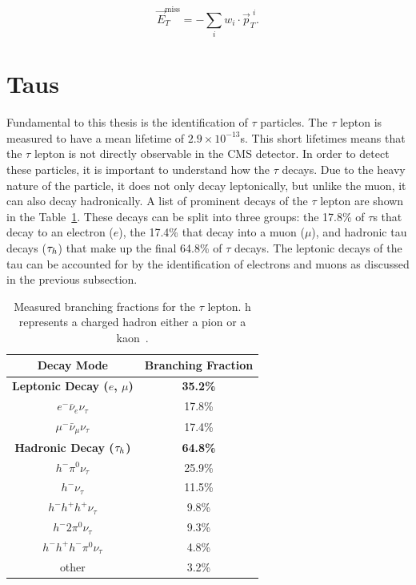 \begin{equation}
\vec{E}_{T}^{\text{miss}} = - \sum_{i} w_{i} \cdot \vec{p}_{T}^{\hspace{4pt}i}.
\end{equation}

\section{Taus}
\label{sec:taus}

Fundamental to this thesis is the identification of $\tau$ particles.
The $\tau$ lepton is measured to have a mean lifetime of \(2.9 \times 10^{-13}\)s. 
This short lifetimes means that the $\tau$ lepton is not directly observable in the \ac{CMS} detector.  
In order to detect these particles, it is important to understand how the $\tau$ decays. 
Due to the heavy nature of the particle, it does not only decay leptonically, but unlike the muon, it can also decay hadronically.
A list of prominent decays of the $\tau$ lepton are shown in the Table~\ref{tab:tau_decay}.
These decays can be split into three groups: the 17.8\% of $\tau$s that decay to an electron ($e$), the 17.4\% that decay into a muon ($\mu$), and hadronic tau decays ($\tau_{h}$) that make up the final 64.8\% of $\tau$ decays. 
The leptonic decays of the tau can be accounted for by the identification of electrons and muons as discussed in the previous subsection.  \\

\begin{table}[h]
    \centering
    \begin{tabular}{|c|c|}
         \hline
         Decay Mode & Branching Fraction  \\
         \hline
         \hline
         \textbf{Leptonic Decay ($e$, $\mu$)} & \textbf{35.2\%} \\
         $e^- \bar{\nu}_e \nu_\tau $ & 17.8\% \\
         $\mu^- \bar{\nu}_\mu \nu_\tau $ & 17.4\% \\
         \hline
         \textbf{Hadronic Decay ($\tau_{h}$)} & \textbf{64.8\%} \\
         $h^- \pi^0 \nu_\tau $ & 25.9\% \\
         $h^- \nu_\tau$ & 11.5\% \\
         $h^- h^+ h^+ \nu_\tau$ & 9.8\% \\
         $h^- 2\pi^0 \nu_\tau$ & 9.3\% \\
         $h^- h^+ h^- \pi^0 \nu_\tau$ & 4.8\% \\
         other & 3.2\% \\
         \hline
    \end{tabular}
    \caption{Measured branching fractions for the $\tau$ lepton. h represents a charged hadron either a pion or a kaon~\cite{ParticleDataGroup:2022pth}.}
    \label{tab:tau_decay}
\end{table}

